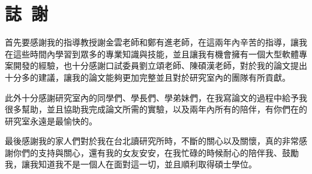 \chapter*{誌~謝~}

\indent
 首先要感謝我的指導教授謝金雲老師和鄭有進老師，在這兩年內辛苦的指導，讓我在這些時間內學習到眾多的專業知識與技能，並且讓我有機會擁有一個大型軟體專案開發的經驗，也十分感謝口試委員劉立頌老師、陳碩漢老師，對於我的論文提出十分多的建議，讓我的論文能夠更加完整並且對於研究室內的團隊有所貢獻。

\indent
 此外十分感謝研究室內的同學們、學長們、學弟妹們，在我寫論文的過程中給予我很多幫助，並且協助我完成論文所需的實驗，以及兩年內所有的陪伴，有你們在的研究室永遠是最愉快的。

\indent
 最後感謝我的家人們對於我在台北讀研究所時，不斷的關心以及關懷，真的非常感謝你們的支持與關心，還有我的女友安安，在我忙碌的時候耐心的陪伴我、鼓勵我，讓我知道我不是一個人在面對這一切，並且順利取得碩士學位。